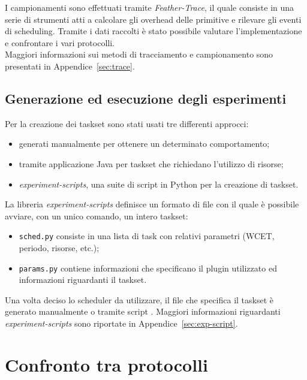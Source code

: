 I campionamenti sono effettuati tramite \textit{Feather-Trace}, il quale consiste in una serie di strumenti atti a calcolare gli overhead delle primitive e rilevare gli eventi di scheduling. Tramite i dati raccolti è stato possibile valutare l'implementazione e confrontare i vari protocolli.\\
Maggiori informazioni sui metodi di tracciamento e campionamento sono presentati in Appendice~\ref{sec:trace}.\\

\subsection{Generazione ed esecuzione degli esperimenti}

Per la creazione dei taskset sono stati usati tre differenti approcci:

\begin{itemize}
	\item generati manualmente per ottenere un determinato comportamento;
	\item tramite applicazione Java per taskset che richiedano l'utilizzo di risorse;
	\item \textit{experiment-scripts}, una suite di script in Python per la creazione di taskset.
\end{itemize}

La libreria \textit{experiment-scripts} definisce un formato di file con il quale è possibile avviare, con un unico comando, un intero taskset:

\begin{itemize}
  \item \texttt{sched.py} consiste in una lista di task con relativi parametri (WCET, periodo, risorse, etc.);
  \item \texttt{params.py} contiene informazioni che specificano il plugin utilizzato ed informazioni riguardanti il taskset.
\end{itemize}

Una volta deciso lo scheduler da utilizzare, il file che specifica il taskset è generato manualmente o tramite script . Maggiori informazioni riguardanti \textit{experiment-scripts} sono riportate in Appendice~\ref{sec:exp-script}.\\

\section{Confronto tra protocolli}
\label{sec:confronto_protocolli}


